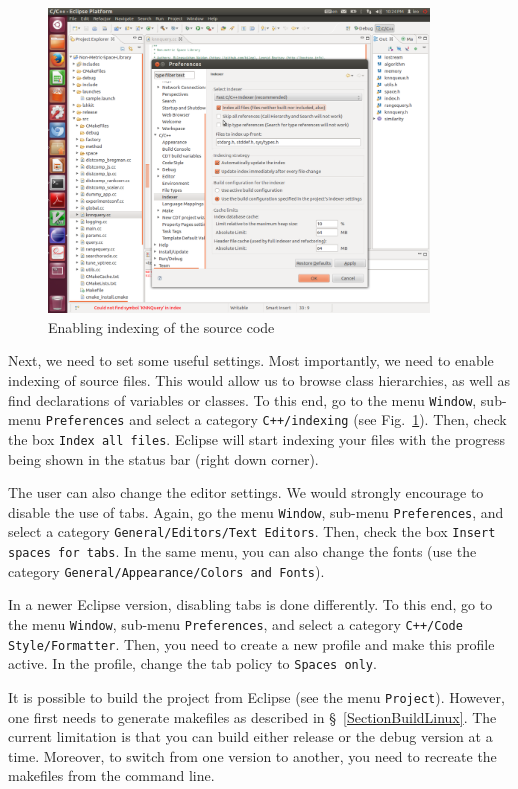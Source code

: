 \documentclass[runningheads,a4paper]{llncs}
\newcommand{\ttt}[1]{\texttt{#1}}
\begin{document}
{\begin{figure}
\centering
\caption{\label{FigEclipse3}Enabling indexing of the source code}
\includegraphics[width=0.9\textwidth]{figures/Eclipse3.pdf}
\end{figure}

Next, we need to set some useful settings.
Most importantly, we need to enable indexing of source files.
This would allow us to browse class hierarchies, as well as find declarations
of variables or classes.
To this end, go to the menu \ttt{Window}, sub-menu \ttt{Preferences}
and select a category \ttt{C++/indexing} (see Fig.~\ref{FigEclipse3}).
Then, check the box \ttt{Index all files}.
Eclipse will start indexing your files 
with the progress being shown in the status bar (right down corner).

The user can also change the editor settings. 
We would strongly encourage to disable the use of tabs.
Again, go the menu \ttt{Window}, sub-menu \ttt{Preferences},
and select a category \ttt{General/Editors/Text Editors}.
Then, check the box \ttt{Insert spaces for tabs}.
In the same menu, you can also change the fonts (use the
category \ttt{General/Appearance/Colors and Fonts}).

In a newer Eclipse version, disabling tabs is done differently. 
To this end, go to the menu \ttt{Window}, sub-menu \ttt{Preferences},
and select a category \ttt{C++/Code Style/Formatter}.
Then, you need to create a new profile and make this profile active. 
In the profile, change the tab policy to \ttt{Spaces only}. 

It is possible to build the project from Eclipse  (see the menu \ttt{Project}).
However, one first needs to generate makefiles as described in \S~\ref{SectionBuildLinux}.
The current limitation is that you can build either release
or the debug version at a time.
Moreover, to switch from one version to another, you need to recreate
the makefiles from the command line.

}
\end{document}
